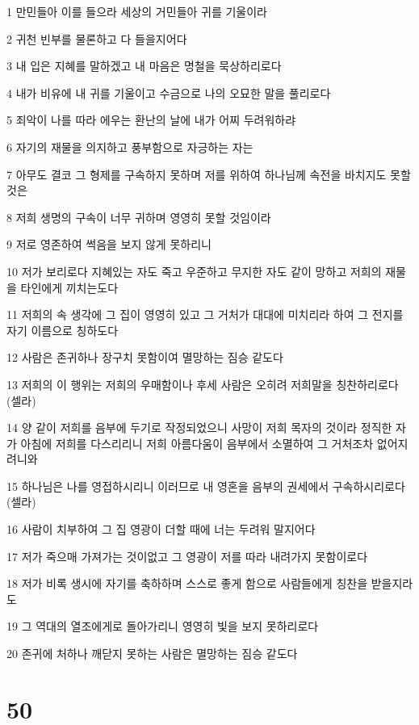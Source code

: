 \par 1 만민들아 이를 들으라 세상의 거민들아 귀를 기울이라
\par 2 귀천 빈부를 물론하고 다 들을지어다
\par 3 내 입은 지혜를 말하겠고 내 마음은 명철을 묵상하리로다
\par 4 내가 비유에 내 귀를 기울이고 수금으로 나의 오묘한 말을 풀리로다
\par 5 죄악이 나를 따라 에우는 환난의 날에 내가 어찌 두려워하랴
\par 6 자기의 재물을 의지하고 풍부함으로 자긍하는 자는
\par 7 아무도 결코 그 형제를 구속하지 못하며 저를 위하여 하나님께 속전을 바치지도 못할 것은
\par 8 저희 생명의 구속이 너무 귀하며 영영히 못할 것임이라
\par 9 저로 영존하여 썩음을 보지 않게 못하리니
\par 10 저가 보리로다 지혜있는 자도 죽고 우준하고 무지한 자도 같이 망하고 저희의 재물을 타인에게 끼치는도다
\par 11 저희의 속 생각에 그 집이 영영히 있고 그 거처가 대대에 미치리라 하여 그 전지를 자기 이름으로 칭하도다
\par 12 사람은 존귀하나 장구치 못함이여 멸망하는 짐승 같도다
\par 13 저희의 이 행위는 저희의 우매함이나 후세 사람은 오히려 저희말을 칭찬하리로다 (셀라)
\par 14 양 같이 저희를 음부에 두기로 작정되었으니 사망이 저희 목자의 것이라 정직한 자가 아침에 저희를 다스리리니 저희 아름다움이 음부에서 소멸하여 그 거처조차 없어지려니와
\par 15 하나님은 나를 영접하시리니 이러므로 내 영혼을 음부의 권세에서 구속하시리로다 (셀라)
\par 16 사람이 치부하여 그 집 영광이 더할 때에 너는 두려워 말지어다
\par 17 저가 죽으매 가져가는 것이없고 그 영광이 저를 따라 내려가지 못함이로다
\par 18 저가 비록 생시에 자기를 축하하며 스스로 좋게 함으로 사람들에게 칭찬을 받을지라도
\par 19 그 역대의 열조에게로 돌아가리니 영영히 빛을 보지 못하리로다
\par 20 존귀에 처하나 깨닫지 못하는 사람은 멸망하는 짐승 같도다

\chapter{50}

